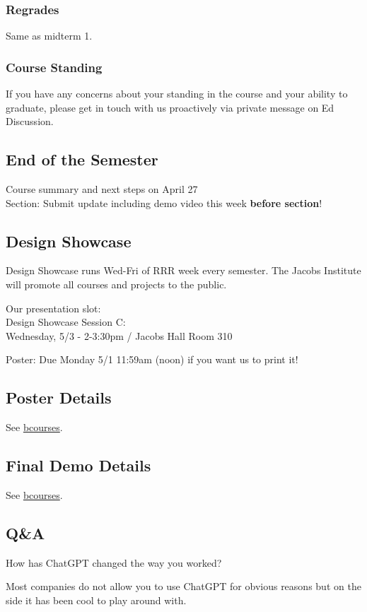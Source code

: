 \subsubsection{Regrades}
Same as midterm 1.

\subsubsection{Course Standing}
If you have any concerns about your standing in the
course and your ability to graduate, please get in
touch with us proactively via private message on Ed
Discussion.

\subsection{End of the Semester}
Course summary and next steps on April 27\\
Section: Submit update including demo video this week \textbf{before section}!

\subsection{Design Showcase}
Design Showcase runs Wed-Fri of RRR week every semester. The Jacobs Institute will promote all courses and projects to the public.

Our presentation slot:\\
Design Showcase Session C:\\
Wednesday, 5/3 - 2-3:30pm / Jacobs Hall Room 310

Poster: Due Monday 5/1 11:59am (noon) if you want us to print it!

\subsection{Poster Details}
See \href{https://bcourses.berkeley.edu/courses/1523321/assignments/8584015}{bcourses}.

\subsection{Final Demo Details}
See \href{https://bcourses.berkeley.edu/courses/1523321/assignments/8578979}{bcourses}.

\subsection{Q\&A}
How has ChatGPT changed the way you worked?
\begin{shaded}
Most companies do not allow you to use ChatGPT for obvious reasons but on the side it has been cool to play around with.
\end{shaded}

